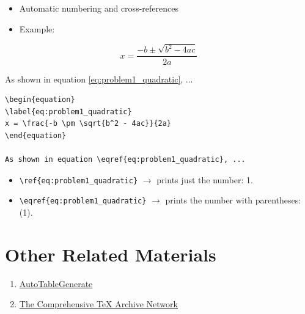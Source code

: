 \documentclass[12pt,a4paper]{article}
\begin{document}
\begin{itemize}
    \item Automatic numbering and cross-references
    \item Example:
\end{itemize}

\begin{equation}
\label{eq:problem1_quadratic}
x = \frac{-b \pm \sqrt{b^2 - 4ac}}{2a}
\end{equation}

As shown in equation \eqref{eq:problem1_quadratic}, ...

\begin{verbatim}
\begin{equation}
\label{eq:problem1_quadratic}
x = \frac{-b \pm \sqrt{b^2 - 4ac}}{2a}
\end{equation}

As shown in equation \eqref{eq:problem1_quadratic}, ...
\end{verbatim}

\begin{itemize}
    \item \verb|\ref{eq:problem1_quadratic}| $\rightarrow$ prints just the number: 1.
    \item \verb|\eqref{eq:problem1_quadratic}| $\rightarrow$ prints the number with parentheses: (1).
\end{itemize}

\section{\color[HTML]{2874A6}Other Related Materials}

\begin{enumerate}
    \item \href{https://www.tablesgenerator.com/}{AutoTableGenerate}
    \item \href{https://www.ctan.org/}{The Comprehensive TeX Archive Network}
\end{enumerate}
\end{document}
